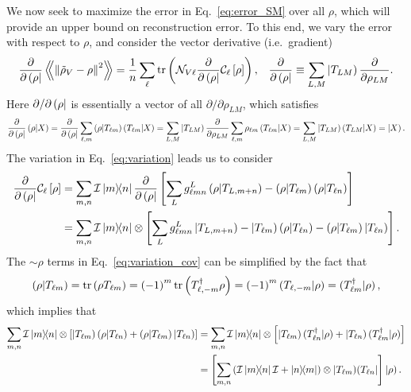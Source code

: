 \documentclass[notitlepage,twocolumn]{revtex4-2}
\newcommand{\f}[2]{\dfrac{#1}{#2}} %
\newcommand{\p}[1]{\left(#1\right)} %
\renewcommand{\sp}[1]{\left[#1\right]} %
\newcommand{\Bbk}[1]
{\left\langle\!\!\left\langle #1 \right\rangle\!\!\right\rangle}
\newcommand{\C}{\mathcal{C}}
\newcommand{\I}{\mathcal{I}}
\newcommand{\N}{\mathcal{N}}
\def\obra#1{\mathinner{({#1}|}}
\def\oket#1{\mathinner{|{#1})}}
\def\obk#1{\mathinner{({#1})}}
\def\oop#1#2{\oket{#1}\!\obra{#2}}
\begin{document}
We now seek to maximize the error in Eq.~\eqref{eq:error_SM} over all $\rho$, which will provide an upper bound on reconstruction error.
To this end, we vary the error with respect to $\rho$, and consider the vector derivative (i.e.~gradient)
\begin{align}
  \f{\partial}{\partial\obra\rho} \Bbk{\norm{\tilde\rho_V-\rho}^2}
  = \f1n \sum_\ell \tr\p{\N_{V\ell}
    \f{\partial}{\partial\obra\rho} \C_\ell\sp{\rho}},
  &&
  \f{\partial}{\partial\obra\rho}
  \equiv \sum_{L,M} \oket{T_{LM}} \f{\partial}{\partial\rho_{LM}}.
  \label{eq:variation}
\end{align}
Here $\partial/\partial\obra\rho$ is essentially a vector of all $\partial/\partial\rho_{LM}$, which satisfies
\begin{align}
  \f{\partial}{\partial\obra\rho} \obk{\rho|X}
  = \f{\partial}{\partial\obra\rho}
  \sum_{\ell,m} \obk{\rho|T_{\ell m}} \obk{T_{\ell m}|X}
  = \sum_{L,M} \oket{T_{LM}} \f{\partial}{\partial\rho_{LM}}
  \sum_{\ell,m} \rho_{\ell m} \obk{T_{\ell m}|X}
  = \sum_{L,M} \oket{T_{LM}} \obk{T_{LM}|X}
  = \oket{X}.
\end{align}
The variation in Eq.~\eqref{eq:variation} leads us to consider
\begin{align}
  \f{\partial}{\partial\obra\rho} \C_\ell\sp{\rho}
  &= \sum_{m,n} \I \op{m}{n}
  \f{\partial}{\partial\obra\rho}
  \sp{\sum_L g_{\ell mn}^L \obk{\rho|T_{L,m+n}}
    - \obk{\rho|T_{\ell m}} \obk{\rho|T_{\ell n}}} \\
  &= \sum_{m,n} \I\op{m}{n} \otimes
  \sp{\sum_L g_{\ell mn}^L \oket{T_{L,m+n}}
    - \oket{T_{\ell m}} \obk{\rho|T_{\ell n}}
    - \obk{\rho|T_{\ell m}} \oket{T_{\ell n}}}.
  \label{eq:variation_cov}
\end{align}
The $\sim\rho$ terms in Eq.~\eqref{eq:variation_cov} can be simplified by the fact that
\begin{align}
  \obk{\rho|T_{\ell m}}
  = \tr\p{\rho T_{\ell m}}
  = \p{-1}^m \tr\p{T_{\ell,-m}^\dag \rho}
  = \p{-1}^m \obk{T_{\ell,-m}|\rho}
  = \obk{T_{\ell m}^\dag|\rho},
\end{align}
which implies that
\begin{align}
  \sum_{m,n} \I \op{m}{n} \otimes
  \sp{\oket{T_{\ell m}} \obk{\rho|T_{\ell n}}
    + \obk{\rho|T_{\ell m}} \oket{T_{\ell n}}}
  &= \sum_{m,n} \I \op{m}{n} \otimes
  \sp{\oket{T_{\ell m}} \obk{T_{\ell n}^\dag|\rho}
    + \oket{T_{\ell n}} \obk{T_{\ell m}^\dag|\rho}} \\
  &= \sp{\sum_{m,n} \p{\I\op{m}{n}\I + \op{n}{m}}
    \otimes \oop{T_{\ell m}}{T_{\ell n}}} \oket{\rho}.
\end{align}
\end{document}

